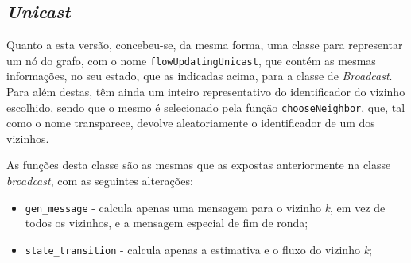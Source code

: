 \documentclass[a4paper]{report}
\begin{document}
{		\subsection{\textit{Unicast}} \label{subsec:Unicast}
		Quanto a esta versão, concebeu-se, da mesma forma, uma classe para representar um nó do grafo, com o nome \texttt{flowUpdatingUnicast}, que contém as mesmas informações, no seu estado, que as indicadas acima, para a classe de \textit{Broadcast}.
		Para além destas, têm ainda um inteiro representativo do identificador do vizinho escolhido, sendo que o mesmo é selecionado pela função \texttt{chooseNeighbor}, que, tal como o nome transparece, devolve aleatoriamente o identificador de um dos vizinhos.

		As funções desta classe são as mesmas que as expostas anteriormente na classe \textit{broadcast}, com as seguintes alterações:
		\begin{itemize}
			\item \texttt{gen\_message} - calcula apenas uma mensagem para o vizinho \textit{k}, em vez de todos os vizinhos, e a mensagem especial de fim de ronda;
			\item \texttt{state\_transition} - calcula apenas a estimativa e o fluxo do vizinho \textit{k};
		\end{itemize}
}
\end{document}
